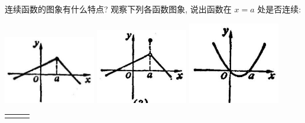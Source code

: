 \documentclass[lang=cn,newtx,10pt,scheme=chinese]{elegantbook}
\begin{document}
\begin{problemset}[练习]


\item 连续函数的图象有什么特点? 观察下列各函数图象, 说出函数在 \(x = a\) 处是否连续:

\begin{center}
	\includegraphics[max width=0.3\textwidth]{images/01912c18-5c3f-733d-b775-749ba9897a9d_35_115885.jpg}
	\includegraphics[max width=0.3\textwidth]{images/01912c18-5c3f-733d-b775-749ba9897a9d_35_560451.jpg}
	\includegraphics[max width=0.3\textwidth]{images/01912c18-5c3f-733d-b775-749ba9897a9d_35_351282.jpg}
\end{center}

\noindent %
\begin{tabular}{ccc}
	\makebox[0.3\textwidth][c]{(1)} &
	\makebox[0.3\textwidth][c]{(2)} &
	\makebox[0.3\textwidth][c]{(3)}
\end{tabular}


\end{problemset}
\end{document}
